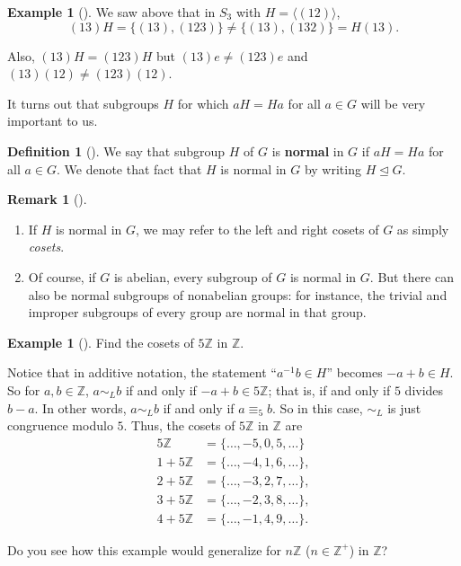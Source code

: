 \documentclass[10pt,]{book}
\newcommand{\terminology}[1]{\textbf{#1}}
\theoremstyle{plain}
\theoremstyle{definition}
\newtheorem{definition}[theorem]{Definition}
\theoremstyle{definition}
\newtheorem{remark}[theorem]{Remark}
\theoremstyle{definition}
\newtheorem{example}[theorem]{Example}
\theoremstyle{definition}
\numberwithin{equation}{section}
\def\Z{\mathbb{Z}}
\def\siml{\sim_L}
\newcommand{\amp}{&}
\begin{document}
\begin{example}[]\label{example-70}
We saw above that in \(S_3\) with \(H=\langle (12)\rangle\),%
\begin{equation*}
(13)H=\{(13),(123)\} \neq \{(13),(132)\}=H(13).
\end{equation*}
%
\par
Also, \((13)H=(123)H\) but \((13)e\neq (123)e\) and \((13)(12)\neq (123)(12)\).%
\end{example}
It turns out that subgroups \(H\) for which \(aH=Ha\) for all \(a\in
G\) will be very important to us.%
\begin{definition}[{}]\label{definition-62}
We say that subgroup \(H\) of \(G\) is \terminology{normal} in \(G\) if \(aH=Ha\) for all \(a\in G\). We denote that fact that \(H\) is normal in \(G\) by writing \(H\unlhd G\).%
\end{definition}
\begin{remark}[]\label{remark-39}
\leavevmode%
\begin{enumerate}
\item\hypertarget{li-417}{}If \(H\) is normal in \(G\), we may refer to the left and right cosets of \(G\) as simply \emph{cosets}.%
\item\hypertarget{li-418}{}Of course, if \(G\) is abelian, every subgroup of \(G\) is normal in \(G\). But there can also be normal subgroups of nonabelian groups: for instance, the trivial and improper subgroups of every group are normal in that group.%
\end{enumerate}
\end{remark}
\begin{example}[]\label{example-71}
Find the cosets of \(5\Z\) in \(\Z\).%
\par
Notice that in additive notation, the statement ``\(a^{-1}b\in H\)'' becomes \(-a+b\in H\). So for \(a,b\in \Z\), \(a\siml b\) if and only if \(-a+b \in
5\Z\); that is, if and only if \(5\) divides \(b-a\). In other words, \(a\siml b\) if and only if \(a\equiv_5 b\). So in this case, \(\siml\) is just congruence modulo \(5\). Thus, the cosets of \(5\Z\) in \(\Z\) are%
\begin{align*}
5\Z\amp =\{\ldots,-5,0,5,\ldots\}\\
1+5\Z\amp =\{\ldots,-4, 1,
6,\ldots\},\\
2+5\Z\amp =\{\ldots,-3,2, 7,
\ldots\},\\
3+5\Z\amp =\{\ldots,-2,3, 8,
\ldots\},\\
4+5\Z\amp =\{\ldots,-1, 4, 9,
\ldots\}.
\end{align*}
%
\par
Do you see how this example would generalize for \(n\Z\) (\(n \in \Z^+\)) in \(\Z\)?%
\end{example}
\end{document}
